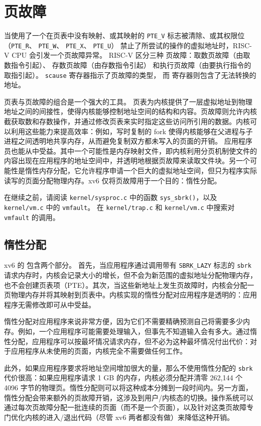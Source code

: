 \chapter{页故障}
\label{CH:PGFAULTS}

当使用了一个在页表中没有映射、或其映射的 \lstinline{PTE_V}
标志被清除、或其权限位（\lstinline{PTE_R}、
\lstinline{PTE_W}、
\lstinline{PTE_X}、
\lstinline{PTE_U}）
禁止了所尝试的操作的虚拟地址时，RISC-V CPU 会引发一个页故障异常。
RISC-V 区分三种
页故障：取数页故障（由取数指令引起）、
存数页故障（由存数指令引起）
和执行页故障（由要执行指令的取指引起）。
\lstinline{scause} 寄存器指示了页故障的类型，
而  寄存器则包含了无法转换的地址。

页表与页故障的组合是一个强大的工具。
页表为内核提供了一层虚拟地址到物理地址之间的间接性，使得内核能够控制地址空间的结构和内容。页故障则允许内核截获取数和存数操作，并通过修改页表来实时指定这些访问所引用的数据。内核可以利用这些能力来提高效率：例如，写时复制的 fork 使得内核能够在父进程与子进程之间透明地共享内存，从而避免复制双方都未写入的页面的开销。
应用程序员也能从中受益。其中一个可能性是内存映射文件，即内核利用分页机制使文件的内容出现在应用程序的地址空间中，并透明地根据页故障来读取文件块。另一个可能性是惰性内存分配，它允许程序申请一个巨大的虚拟地址空间，但只为程序实际读写的页面分配物理内存。xv6 仅将页故障用于一个目的：惰性分配。

在继续之前，请阅读 {\tt kernel/sysproc.c} 中的函数 {\tt sys\_sbrk()}，以及 {\tt kernel/vm.c} 中的 {\tt vmfault}。
在 {\tt kernel/trap.c} 和 {\tt kernel/vm.c} 中搜索对 {\tt vmfault} 的调用。

\section{惰性分配}
\label{sec:lazy}

xv6 的  包含两个部分。
首先，当应用程序通过调用带有 \lstinline{SBRK_LAZY} 标志的 \lstinline{sbrk} 请求内存时，内核会记录大小的增长，但不会为新范围的虚拟地址分配物理内存，也不会创建页表项（PTE）。其次，当这些新地址上发生页故障时，内核会分配一页物理内存并将其映射到页表中。内核实现的惰性分配对应用程序是透明的：应用程序无需修改即可从中受益。

惰性分配对应用程序来说非常方便，因为它们不需要精确预测自己将需要多少内存。例如，一个应用程序可能需要处理输入，但事先不知道输入会有多大。通过惰性分配，应用程序可以按最坏情况请求内存，但不必为这种最坏情况付出代价：对于应用程序从未使用的页面，内核完全不需要做任何工作。

此外，如果应用程序要求将地址空间增加很大的量，那么不使用惰性分配的 \lstinline{sbrk} 代价很高：如果应用程序请求 1 GB 的内存，内核必须分配并清零 262,144 个 4096 字节的物理页。惰性分配则可以将这种成本分摊到一段时间内。另一方面，惰性分配会带来额外的页故障开销，这涉及到用户/内核态的切换。操作系统可以通过每次页故障分配一批连续的页面（而不是一个页面），以及针对这类页故障专门优化内核的进入/退出代码（尽管 xv6 两者都没有做）来降低这种开销。


